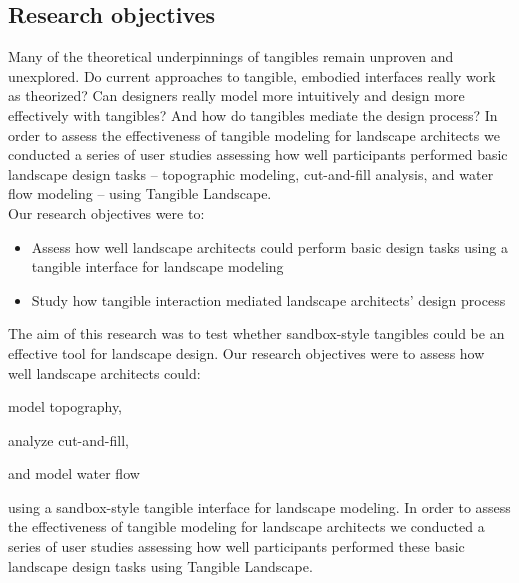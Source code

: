 

\subsection{Research objectives}
Many of the theoretical underpinnings of tangibles 
remain unproven and unexplored. 
Do current approaches to tangible, embodied interfaces
really work as theorized? 
Can designers really model more intuitively and 
design more effectively with tangibles?
And how do tangibles mediate the design process?
In order to assess the effectiveness 
of tangible modeling for landscape architects 
we conducted a series of user studies
assessing how well participants performed
basic landscape design tasks 
-- topographic modeling, cut-and-fill analysis, and water flow modeling --
using Tangible Landscape.\\

Our research objectives were to:
%
\begin{itemize}
\item Assess how well landscape architects could perform 
basic design tasks using a tangible interface for landscape modeling
\item Study how tangible interaction mediated
landscape architects' design process
\end{itemize}

The aim of this research was to test whether
sandbox-style tangibles could be an effective tool
for landscape design. 
%
%
Our research objectives were 
to assess how well landscape architects could:
\begin{enumerate*}[label=\alph*),font=\itshape]
\item model topography, 
\item analyze cut-and-fill, 
\item and model water flow
\end{enumerate*}
using a sandbox-style tangible interface for landscape modeling.
%
In order to assess the effectiveness 
of tangible modeling for landscape architects 
we conducted a series of user studies
assessing how well participants performed
these basic landscape design tasks 
using Tangible Landscape.

